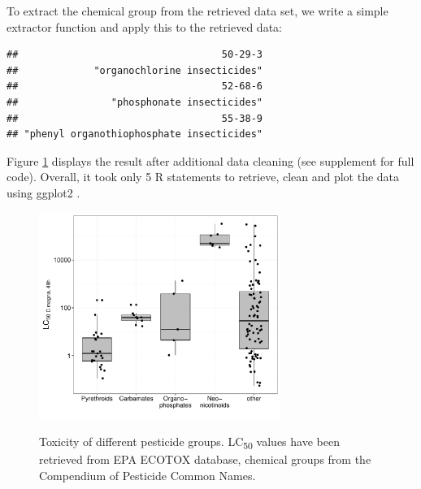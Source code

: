 To extract the chemical group from the retrieved data set, we write a simple extractor function and apply this to the retrieved data:

\begin{knitrout}
\color{fgcolor}\begin{kframe}
\begin{alltt}
 \hlkwb{<-}  \hlstd{(}\hlopt{$}\hlstd{subactivity[}\hlstd{])}
\hlstd{igroup[}\hlopt{:}\hlstd{]}
\end{alltt}
\begin{verbatim}
##                                   50-29-3 
##             "organochlorine insecticides" 
##                                   52-68-6 
##                "phosphonate insecticides" 
##                                   55-38-9 
## "phenyl organothiophosphate insecticides"
\end{verbatim}
\end{kframe}
\end{knitrout}

Figure \ref{fig:fig2} displays the result after additional data cleaning (see supplement for full code).
Overall, it took only 5 R statements to retrieve, clean and plot the data using ggplot2 \citep{ggplot2}.

\begin{figure}[ht]
\begin{knitrout}
\color{fgcolor}

{\centering 
\includegraphics[width=0.7\textwidth]{chapters/webchem/plot_lc50-1.pdf}
}



\end{knitrout}
\caption[Toxicity of different pesticide groups.]{Toxicity of different pesticide groups. LC\textsubscript{50} values have been retrieved from EPA ECOTOX database, chemical groups from the Compendium of Pesticide Common Names.}
\label{fig:fig2}
\end{figure}


